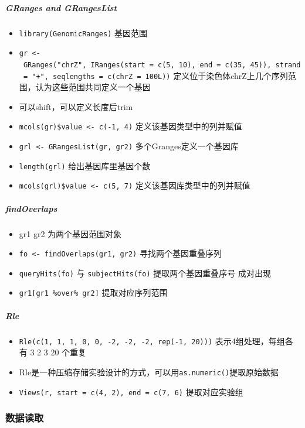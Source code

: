\documentclass[]{book}
\providecommand{\tightlist}{%
  \setlength{\itemsep}{0pt}\setlength{\parskip}{0pt}}
\let\oldsubparagraph\subparagraph
\renewcommand{\subparagraph}[1]{\oldsubparagraph{#1}\mbox{}}
\begin{document}
\hypertarget{granges-and-grangeslist}{%
\subparagraph{GRanges and GRangesList}\label{granges-and-grangeslist}}

\begin{itemize}
\tightlist
\item
  \texttt{library(GenomicRanges)} 基因范围
\item
  \texttt{gr\ \textless{}-\ GRanges("chrZ",\ IRanges(start\ =\ c(5,\ 10),\ end\ =\ c(35,\ 45)),\ strand\ =\ "+",\ seqlengths\ =\ c(chrZ\ =\ 100L))} 定义位于染色体chrZ上几个序列范围，认为这些范围共同定义一个基因
\item
  可以shift，可以定义长度后trim
\item
  \texttt{mcols(gr)\$value\ \textless{}-\ c(-1,\ 4)} 定义该基因类型中的列并赋值
\item
  \texttt{grl\ \textless{}-\ GRangesList(gr,\ gr2)} 多个Granges定义一个基因库
\item
  \texttt{length(grl)} 给出基因库里基因个数
\item
  \texttt{mcols(grl)\$value\ \textless{}-\ c(5,\ 7)} 定义该基因库类型中的列并赋值
\end{itemize}

\hypertarget{findoverlaps}{%
\subparagraph{findOverlaps}\label{findoverlaps}}

\begin{itemize}
\tightlist
\item
  gr1 gr2 为两个基因范围对象
\item
  \texttt{fo\ \textless{}-\ findOverlaps(gr1,\ gr2)} 寻找两个基因重叠序列
\item
  \texttt{queryHits(fo)} 与 \texttt{subjectHits(fo)} 提取两个基因重叠序号 成对出现
\item
  \texttt{gr1{[}gr1\ \%over\%\ gr2{]}} 提取对应序列范围
\end{itemize}

\hypertarget{rle}{%
\subparagraph{Rle}\label{rle}}

\begin{itemize}
\tightlist
\item
  \texttt{Rle(c(1,\ 1,\ 1,\ 0,\ 0,\ -2,\ -2,\ -2,\ rep(-1,\ 20)))} 表示4组处理，每组各有 3 2 3 20 个重复
\item
  Rle是一种压缩存储实验设计的方式，可以用\texttt{as.numeric()}提取原始数据
\item
  \texttt{Views(r,\ start\ =\ c(4,\ 2),\ end\ =\ c(7,\ 6)} 提取对应实验组
\end{itemize}

\hypertarget{ux6570ux636eux8bfbux53d6}{%
\subsubsection{数据读取}\label{ux6570ux636eux8bfbux53d6}}
\end{document}
